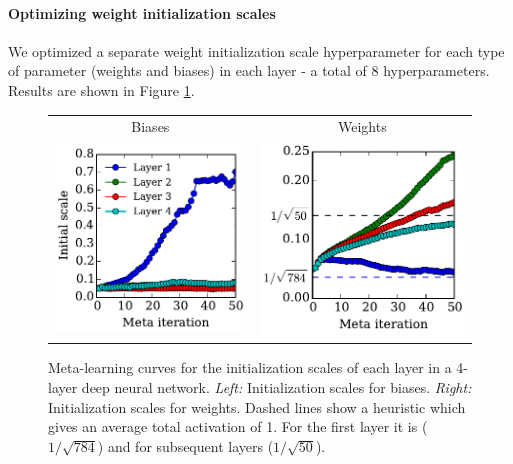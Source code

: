 \documentclass{article}
\begin{document}
\paragraph{Optimizing weight initialization scales}
We optimized a separate weight initialization scale hyperparameter for each type of parameter (weights and biases) in each layer - a total of 8 hyperparameters.
Results are shown in Figure \ref{fig:nn weight init scales}.
%
\begin{figure}[h!]
\vskip 0.2in
\begin{center}
\begin{tabular}{cc}
 Biases & Weights \\
\hspace{-1em}\includegraphics[width=0.5\columnwidth, height=0.5\columnwidth]{../experiments/Feb_3_training_schedules/3_adam_50/init_bias_learning_curve.pdf} &
\hspace{-1em}\includegraphics[width=0.5\columnwidth, height=0.5\columnwidth]{../experiments/Feb_3_training_schedules/3_adam_50/init_weight_learning_curve.pdf}
\end{tabular}
\caption{Meta-learning curves for the initialization scales of each layer in a 4-layer deep neural network.
\emph{Left:} Initialization scales for biases.
\emph{Right:} Initialization scales for weights.
Dashed lines show a heuristic which gives an average total activation of 1.
For the first layer it is ($1/\sqrt{784}$) and for subsequent layers ($1/\sqrt{50}$).}
\label{fig:nn weight init scales}
\end{center}
\vskip -0.2in
\end{figure}
\end{document}
